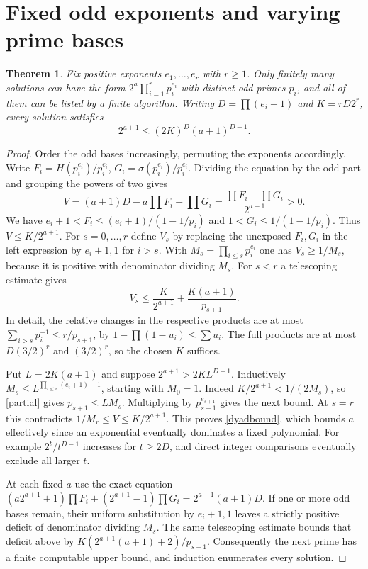 \documentclass[11pt]{article}
\newtheorem{theorem}{Theorem}\newtheorem{lemma}[theorem]{Lemma}
\begin{document}
\section{Fixed odd exponents and varying prime bases}
\begin{theorem}\label{pattern}
Fix positive exponents $e_1,\ldots,e_r$ with $r\ge1$. Only finitely many solutions can have the form $2^a\prod_{i=1}^r p_i^{e_i}$ with distinct odd primes $p_i$, and all of them can be listed by a finite algorithm. Writing $D=\prod(e_i+1)$ and $K=rD2^r$, every solution satisfies
\begin{equation}
 2^{a+1}\le (2K)^D(a+1)^{D-1}.\label{dyadbound}
\end{equation}
\end{theorem}
\begin{proof}
Order the odd bases increasingly, permuting the exponents accordingly. Write $F_i=H(p_i^{e_i})/p_i^{e_i}$, $G_i=\sigma(p_i^{e_i})/p_i^{e_i}$. Dividing the equation by the odd part and grouping the powers of two gives
\[
 V=(a+1)D-a\prod F_i-\prod G_i=\frac{\prod F_i-\prod G_i}{2^{a+1}}>0.
\]
We have $e_i+1<F_i\le(e_i+1)/(1-1/p_i)$ and $1<G_i\le1/(1-1/p_i)$. Thus $V\le K/2^{a+1}$. For $s=0,\ldots,r$ define $V_s$ by replacing the unexposed $F_i,G_i$ in the left expression by $e_i+1,1$ for $i>s$. With $M_s=\prod_{i\le s}p_i^{e_i}$ one has $V_s\ge1/M_s$, because it is positive with denominator dividing $M_s$. For $s<r$ a telescoping estimate gives
\begin{equation}
 V_s\le\frac K{2^{a+1}}+\frac{K(a+1)}{p_{s+1}}.\label{partial}
\end{equation}
In detail, the relative changes in the respective products are at most $\sum_{i>s}p_i^{-1}\le r/p_{s+1}$, by $1-\prod(1-u_i)\le\sum u_i$. The full products are at most $D(3/2)^r$ and $(3/2)^r$, so the chosen $K$ suffices.

Put $L=2K(a+1)$ and suppose $2^{a+1}>2K L^{D-1}$. Inductively $M_s\le L^{\prod_{i\le s}(e_i+1)-1}$, starting with $M_0=1$. Indeed $K/2^{a+1}<1/(2M_s)$, so \eqref{partial} gives $p_{s+1}\le L M_s$. Multiplying by $p_{s+1}^{e_{s+1}}$ gives the next bound. At $s=r$ this contradicts $1/M_r\le V\le K/2^{a+1}$. This proves \eqref{dyadbound}, which bounds $a$ effectively since an exponential eventually dominates a fixed polynomial. For example $2^t/t^{D-1}$ increases for $t\ge2D$, and direct integer comparisons eventually exclude all larger $t$.

At each fixed $a$ use the exact equation $(a2^{a+1}+1)\prod F_i+(2^{a+1}-1)\prod G_i=2^{a+1}(a+1)D$. If one or more odd bases remain, their uniform substitution by $e_i+1,1$ leaves a strictly positive deficit of denominator dividing $M_s$. The same telescoping estimate bounds that deficit above by $K(2^{a+1}(a+1)+2)/p_{s+1}$. Consequently the next prime has a finite computable upper bound, and induction enumerates every solution.
\end{proof}
\end{document}
